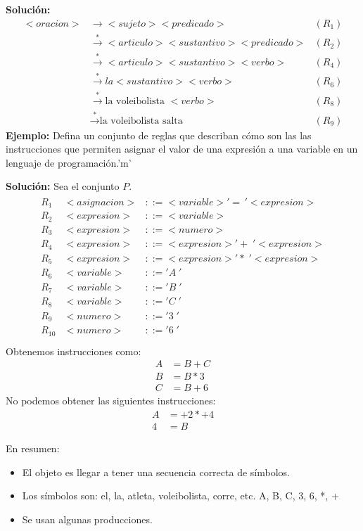 \textbf{Solución: }
\begin{align*}
<oracion>&\rightarrow<sujeto><predicado>	& (R_1)	\\
		 &\xrightarrow{*}<articulo><sustantivo><predicado>	& (R_2)	\\
		 &\xrightarrow{*}<articulo><sustantivo><verbo>	& (R_4)	\\
		 &\xrightarrow{*}la <sustantivo><verbo>			& (R_6)	\\
		 &\xrightarrow{*}\mbox{la voleibolista }<verbo>	& (R_8)	\\
		 &\xrightarrow{*}\mbox{la voleibolista salta}	& (R_9)	
\end{align*}
\textbf{Ejemplo: }Defina un conjunto de reglas que describan cómo son las  las instrucciones que permiten asignar el valor de una expresión a una variable en un lenguaje de programación.'m'

\textbf{Solución: }Sea el conjunto $P$.
\begin{align*}
\begin{array}{lrl}
R_1	&	<asignacion>&::=<variable>'=\,'<expresion>	\\
R_2	&	<expresion>&::=<variable>	\\
R_3	&	<expresion>&::=<numero>		\\
R_4	&	<expresion>&::=<expresion>'+\;'<expresion>	\\
R_5	& 	<expresion>&::=<expresion>'*\;'<expresion>	\\
R_6	&	<variable>&::='A\;'\\
R_7	&	<variable>&::='B\;'	\\
R_8	&	<variable>&::='C\;'	\\
R_9	&	<numero>&::='3\;'		\\
R_{10}&	<numero>&::='6\; '		\\
\end{array}
\end{align*}
Obtenemos instrucciones como:
\begin{align*}
A&=B+C	\\
B&=B*3	\\
C&=B+6
\end{align*}
No podemos obtener las siguientes instrucciones:
\begin{align*}
A&=+2*+4	\\
4&=B
\end{align*}

En resumen:
\begin{itemize}
\item El objeto es llegar a tener una secuencia correcta de símbolos.
\item Los símbolos son: el, la, atleta, voleibolista, corre, etc. A, B, C, 3, 6, *, +
\item Se usan algunas producciones.
\end{itemize}

